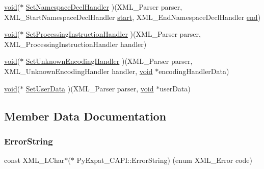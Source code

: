 \begin{DoxyCompactItemize}
\item 
\mbox{\hyperlink{_s_d_l__opengles2__gl2ext_8h_ae5d8fa23ad07c48bb609509eae494c95}{void}}($\ast$ \mbox{\hyperlink{struct_py_expat___c_a_p_i_ad9e94c45149136ca717b975acc06a127}{Set\+Namespace\+Decl\+Handler}} )(X\+M\+L\+\_\+\+Parser parser, X\+M\+L\+\_\+\+Start\+Namespace\+Decl\+Handler \mbox{\hyperlink{_s_d_l__opengl_8h_ac55adc720a3098c1b454d2a4647f4361}{start}}, X\+M\+L\+\_\+\+End\+Namespace\+Decl\+Handler \mbox{\hyperlink{_s_d_l__opengl_8h_a432111147038972f06e049e18a837002}{end}})
\item 
\mbox{\hyperlink{_s_d_l__opengles2__gl2ext_8h_ae5d8fa23ad07c48bb609509eae494c95}{void}}($\ast$ \mbox{\hyperlink{struct_py_expat___c_a_p_i_a215cc650811061dac3193bcb2c3473db}{Set\+Processing\+Instruction\+Handler}} )(X\+M\+L\+\_\+\+Parser parser, X\+M\+L\+\_\+\+Processing\+Instruction\+Handler handler)
\item 
\mbox{\hyperlink{_s_d_l__opengles2__gl2ext_8h_ae5d8fa23ad07c48bb609509eae494c95}{void}}($\ast$ \mbox{\hyperlink{struct_py_expat___c_a_p_i_a0e096e97c2371eb148a6af3916cbba8d}{Set\+Unknown\+Encoding\+Handler}} )(X\+M\+L\+\_\+\+Parser parser, X\+M\+L\+\_\+\+Unknown\+Encoding\+Handler handler, \mbox{\hyperlink{_s_d_l__opengles2__gl2ext_8h_ae5d8fa23ad07c48bb609509eae494c95}{void}} $\ast$encoding\+Handler\+Data)
\item 
\mbox{\hyperlink{_s_d_l__opengles2__gl2ext_8h_ae5d8fa23ad07c48bb609509eae494c95}{void}}($\ast$ \mbox{\hyperlink{struct_py_expat___c_a_p_i_a43b5bc9b3ec3772d9edb2295e9a54489}{Set\+User\+Data}} )(X\+M\+L\+\_\+\+Parser parser, \mbox{\hyperlink{_s_d_l__opengles2__gl2ext_8h_ae5d8fa23ad07c48bb609509eae494c95}{void}} $\ast$user\+Data)
\end{DoxyCompactItemize}


\subsection{Member Data Documentation}
\mbox{\label{struct_py_expat___c_a_p_i_af7c49b4a394f57108377beb4690ccdf9}} 
\subsubsection{\texorpdfstring{ErrorString}{ErrorString}}
{\footnotesize\ttfamily const X\+M\+L\+\_\+\+L\+Char$\ast$($\ast$ Py\+Expat\+\_\+\+C\+A\+P\+I\+::\+Error\+String) (enum X\+M\+L\+\_\+\+Error code)}

